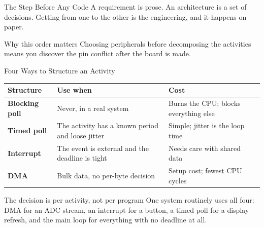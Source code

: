 \documentclass[9pt,aspectratio=169,xcolor=table]{beamer}
\begin{document}
\begin{frame}{The Step Before Any Code}
    \leavevmode
    A requirement is prose. An architecture is a set of decisions. Getting from
    one to the other is \alert{the engineering}, and it happens on paper.

    \vspace{3mm}
    \begin{center}
    \end{center}

    \vspace{2mm}
    \begin{block}{Why this order matters}
        Choosing peripherals before decomposing the activities means you discover
        the pin conflict \alert{after} the board is made.
    \end{block}
\end{frame}

\begin{frame}{Four Ways to Structure an Activity}
    \begin{center}
    {\small
    \striped
    \begin{tabular}{@{}l R{.34\textwidth} R{.32\textwidth}@{}}
        \toprule
        \textbf{Structure} & \textbf{Use when} & \textbf{Cost} \\
        \midrule
        \textbf{Blocking poll} & Never, in a real system & Burns the CPU; blocks everything else \\
        \textbf{Timed poll} & The activity has a known period and loose jitter & Simple; jitter is the loop time \\
        \textbf{Interrupt} & The event is external and the deadline is tight & Needs care with shared data \\
        \textbf{DMA} & Bulk data, no per-byte decision & Setup cost; fewest CPU cycles \\
        \bottomrule
    \end{tabular}}
    \end{center}

    \vspace{3mm}
    \begin{block}{The decision is per activity, not per program}
        One system routinely uses all four: DMA for an ADC stream, an interrupt
        for a button, a timed poll for a display refresh, and the main loop for
        everything with no deadline at all.
    \end{block}
\end{frame}
\end{document}
